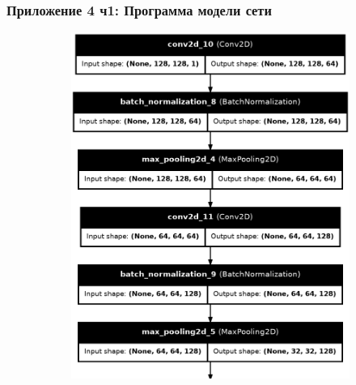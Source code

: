 \documentclass{beamer}
\begin{document}
\begin{frame}
	\label{pril4}
	\vspace{-0.5em}
	\frametitle{Приложение 4 ч1: Программа модели сети}
	\begin{figure}[!hp]
		\centering
		\vspace{-0.1em}
		\begin{subfigure}[t]{0.45\textwidth}
			\centering
			\includegraphics[width=\textwidth]{model_diagram1}
		\end{subfigure}
		\begin{subfigure}[t]{0.45\textwidth}
			\centering

\end{subfigure}
\end{figure}
\end{frame}
\end{document}
